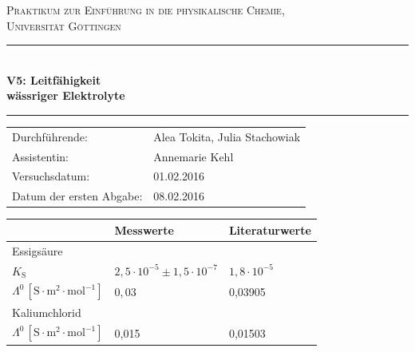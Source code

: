 \documentclass[12pt,a4paper,titlepage,headinclude,bibtotoc]{scrartcl}
\begin{document}
\begin{titlepage}
\centering
\textsc{\Large Praktikum zur Einführung in die physikalische Chemie,\\[1.5ex] Universität Göttingen}

\vspace*{0.5cm}

\rule{\textwidth}{1pt}\\[0.5cm]
{\huge \bfseries
  V5: Leitfähigkeit\\[1.5ex]
  wässriger Elektrolyte}\\[0.5cm]
\rule{\textwidth}{1pt}

\vspace*{0.5cm}


\begin{Large}
\begin{tabular}{ll}
Durchführende: &  Alea Tokita, Julia Stachowiak\\
Assistentin: & Annemarie Kehl\\
 Versuchsdatum: & 01.02.2016\\
 Datum der ersten Abgabe: & 08.02.2016\\

\end{tabular}
\end{Large}

\vspace*{1cm}
\begin{large}
\begin{table} [h]
\centering 
\begin{tabular}{p{3cm}|p{5cm}p{5cm}}
& Messwerte & Literaturwerte\\
\hline
Essigsäure & &\\
 $K_{\mathrm{S}}$ & $2,5 \cdot 10^{-5} \pm 1,5 \cdot 10^{-7}$& $1,8 \cdot 10^{-5}$\protect\footnotemark\\
$\Lambda^0\, [\mathrm{S} \cdot \mathrm{m^2} \cdot \mathrm{mol^{-1}}]$ & $ 0,03\, $& 0,03905\protect\footnotemark\\
\hline
Kaliumchlorid & &\\
$\Lambda^0\, [\mathrm{S} \cdot \mathrm{m^2} \cdot \mathrm{mol^{-1}}]$ & 0,015 & 0,01503\protect\footnotemark\\
\end{tabular}
\end{table}
\end{large}


\end{titlepage}
\end{document}
